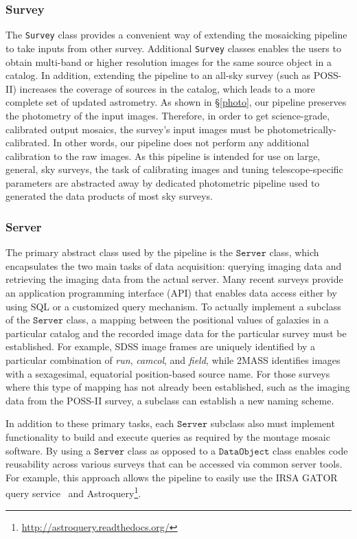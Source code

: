 \documentclass[authoryear, 12pt, 5p, times]{elsarticle}
\begin{document}
\subsubsection{Survey \label{sec:survey}}
The \texttt{Survey} class provides a convenient way of extending the mosaicking pipeline to take inputs from other survey. Additional  \texttt{Survey} classes enables the users to obtain multi-band or higher resolution images for the same source object in a catalog.  In addition, extending the pipeline to an all-sky survey (such as POSS-II) increases the coverage of sources in the catalog, which leads to a more complete set of updated astrometry.  As shown in \S\ref{photo}, our pipeline preserves the photometry of the  input images.  Therefore, in order to get science-grade, calibrated output mosaics, the survey's input images must be photometrically-calibrated. In other words, our pipeline does not perform any additional calibration to the raw images. As this pipeline is intended for use on large, general, sky surveys, the task of calibrating images and tuning telescope-specific parameters are abstracted away by dedicated photometric pipeline used to generated the data products of most sky surveys. 
\subsubsection{Server\label{sec:server}}

The primary abstract class used by the pipeline is the $\texttt{Server}$ class, which encapsulates the two main tasks of data acquisition: querying imaging data and retrieving the imaging data from the actual server. Many recent surveys provide an application programming interface (API) that enables data access either by using SQL or a customized query mechanism. To actually implement a subclass of the $\texttt{Server}$ class, a mapping between the positional values of galaxies in a particular catalog and the recorded image data for the particular survey must be established. For example, SDSS image frames are uniquely identified by a particular combination of \textit{run}, \textit{camcol}, and \textit{field}, while 2MASS identifies images with a sexagesimal, equatorial position-based source name. For those surveys where this type of mapping has not already been established, such as the imaging data from the POSS-II survey, a subclass can establish a new naming scheme.

In addition to these primary tasks, each $\texttt{Server}$ subclass also must implement functionality to build and execute queries as required by the montage mosaic software. By using a $\texttt{Server}$ class as opposed to a $\texttt{DataObject}$ class enables code reusability across various surveys that can be accessed via common server tools. For example, this approach allows the pipeline to easily use the IRSA GATOR query service~\citep{irsa} and Astroquery\footnote{\url{http://astroquery.readthedocs.org/}}.
\end{document}
